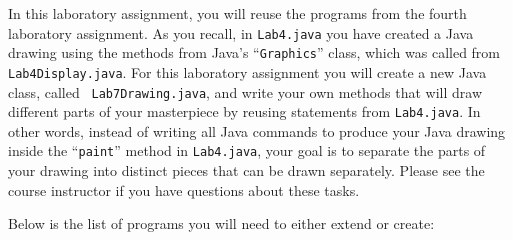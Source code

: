 \noindent In this laboratory assignment, you will reuse the programs from the fourth laboratory assignment. As you
recall, in {\tt Lab4.java} you have created a Java drawing using the methods from Java's ``{\tt Graphics}'' class, which
was called from {\tt Lab4Display.java}. For this laboratory assignment you will create a new Java class, called {\tt
Lab7Drawing.java}, and write your own methods that will draw different parts of your masterpiece by reusing statements
from {\tt Lab4.java}. In other words, instead of writing all Java commands to produce your Java drawing inside the
``{\tt paint}'' method in {\tt Lab4.java}, your goal is to separate the parts of your drawing into  distinct pieces that
can be drawn separately. Please see the course instructor if you have questions about these tasks.

\noindent Below is the list of programs you will need to either extend or create:

